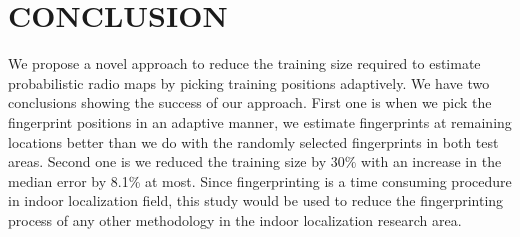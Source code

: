\documentclass{article}
\begin{document}
				
		
	\section{CONCLUSION}
	\label{sec:conclusion}
	We propose a novel approach to reduce the training size required to estimate probabilistic radio maps by picking training positions adaptively. We have two conclusions showing the success of our approach. First one is when we pick the fingerprint positions in an adaptive manner, we estimate fingerprints at remaining locations better than we do with the randomly selected fingerprints in both test areas. Second one is we reduced the training size by $30\%$ with an increase in the median error by 8.1\% at most. Since fingerprinting is a time consuming procedure in indoor localization field, this study would be used to reduce the fingerprinting process of any other methodology in the indoor localization research area.
	
	\vfill\pagebreak
	
	
	
	
	
\end{document}
